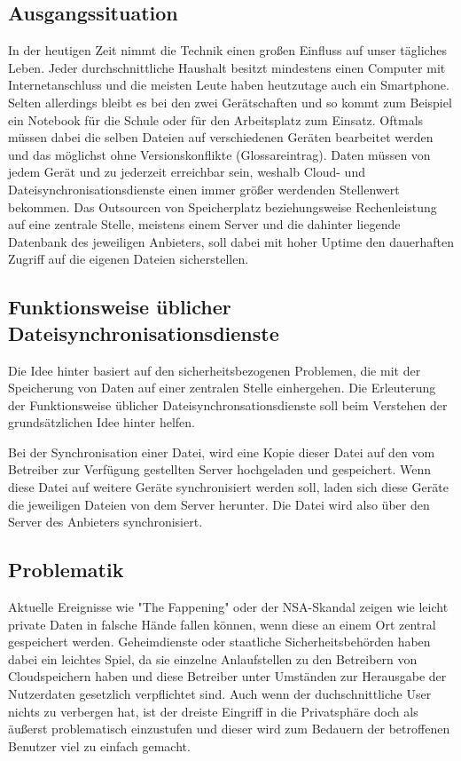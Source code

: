 \subsection{Ausgangssituation}
In der heutigen Zeit nimmt die Technik einen großen Einfluss auf unser tägliches
Leben. Jeder durchschnittliche Haushalt besitzt mindestens einen Computer mit
Internetanschluss und die meisten Leute haben heutzutage auch ein Smartphone.
Selten allerdings bleibt es bei den zwei Gerätschaften und so kommt zum Beispiel
ein Notebook für die Schule oder für den Arbeitsplatz zum Einsatz. Oftmals
müssen dabei die selben Dateien auf verschiedenen Geräten bearbeitet werden und
das möglichst ohne Versionskonflikte (Glossareintrag). Daten müssen von jedem
Gerät und zu jederzeit erreichbar sein, weshalb Cloud- und
Dateisynchronisationsdienste einen immer größer werdenden Stellenwert bekommen.
Das Outsourcen von Speicherplatz beziehungsweise Rechenleistung auf eine
zentrale Stelle, meistens einem Server und die dahinter liegende Datenbank des
jeweiligen Anbieters, soll dabei mit hoher Uptime den dauerhaften Zugriff auf
die eigenen Dateien sicherstellen.

\subsection{Funktionsweise üblicher Dateisynchronisationsdienste}
Die Idee hinter \sblit basiert auf den sicherheitsbezogenen Problemen, die mit
der Speicherung von Daten auf einer zentralen Stelle einhergehen. Die
Erleuterung der Funktionsweise üblicher Dateisynchronsationsdienste soll beim
Verstehen der grundsätzlichen Idee hinter \sblit helfen.

Bei der Synchronisation einer Datei, wird eine Kopie dieser Datei auf den vom
Betreiber zur Verfügung gestellten Server hochgeladen und gespeichert. Wenn
diese Datei auf weitere Geräte synchronisiert werden soll, laden sich diese
Geräte die jeweiligen Dateien von dem Server herunter. Die Datei wird also über
den Server des Anbieters synchronisiert.

\subsection{Problematik}

Aktuelle Ereignisse wie "The Fappening" oder der NSA-Skandal zeigen wie leicht
private Daten in falsche Hände fallen können, wenn diese an einem Ort zentral
gespeichert werden. Geheimdienste oder staatliche Sicherheitsbehörden haben
dabei ein leichtes Spiel, da sie einzelne Anlaufstellen zu den Betreibern von
Cloudspeichern haben und diese Betreiber unter Umständen zur Herausgabe der
Nutzerdaten gesetzlich verpflichtet sind. Auch wenn der duchschnittliche User
nichts zu verbergen hat, ist der dreiste Eingriff in die Privatsphäre doch als
äußerst problematisch einzustufen und dieser wird zum Bedauern der betroffenen
Benutzer viel zu einfach gemacht.

